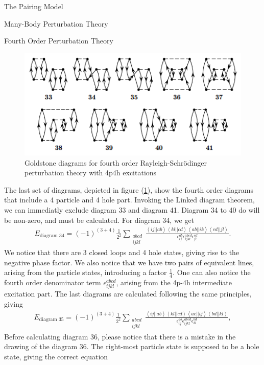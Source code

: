 \documentclass[twoside,english]{uiofysmaster}
\begin{document}
\begin{chapter}{The Pairing Model}
\begin{section}{Many-Body Perturbation Theory}
\begin{subsection}{Fourth Order Perturbation Theory}
			\begin{figure}[H]
				\includegraphics[width=\textwidth]{Figures/fourthorder4p4h.png}
				\caption{Goldstone diagrams for fourth order Rayleigh-Schr\"{o}dinger perturbation theory with 4p4h excitations}
				\label{figure:mbpt4p4h}
			\end{figure}
			The last set of diagrams, depicted in figure (\ref{figure:mbpt4p4h}), show the fourth order diagrams that include a 4 particle and 4 hole part. Invoking the Linked diagram theorem, we can immediatly exclude diagram 33 and diagram 41. Diagram 34 to 40 do will be non-zero, and must be calculated. For diagram 34, we get
			\begin{align}
				E_{\text{diagram 34}} = \left(-1\right)^{(3+4)} \frac{1}{2^2} \sum_{\substack{abcd\\ijkl}} \frac{ \left<ij||ab\right>\left<kl||cd\right>\left<ab||ik\right>\left<cd||jl\right> }{ \epsilon_{ij}^{ab} \epsilon_{ijkl}^{abcd} \epsilon_{jl}^{cd} }.
			\end{align}
			We notice that there are 3 closed loops and 4 hole states, giving rise to the negative phase factor. We also notice that we have two pairs of equivalent lines, arising from the particle states, introducing a factor $\frac{1}{4}$. One can also notice the fourth order denominator term $\epsilon_{ijkl}^{abcd}$, arising from the 4p-4h intermediate excitation part. The last diagrams are calculated following the same principles, giving 
			\begin{align}
				E_{\text{diagram 35}} = \left(-1\right)^{(3+4)} \frac{1}{2^2} \sum_{\substack{abcd\\ijkl}} \frac{ \left<ij||ab\right>\left<kl||cd\right>\left<ac||ij\right>\left<bd||kl\right> }{ \epsilon_{ij}^{ab} \epsilon_{ijkl}^{abcd} \epsilon_{kl}^{bd} },
			\end{align}
			Before calculating diagram 36, please notice that there is a mistake in the drawing of the diagram 36. The right-most particle state is supposed to be a hole state, giving the correct equation 

\end{subsection}
\end{section}
\end{chapter}
\end{document}
